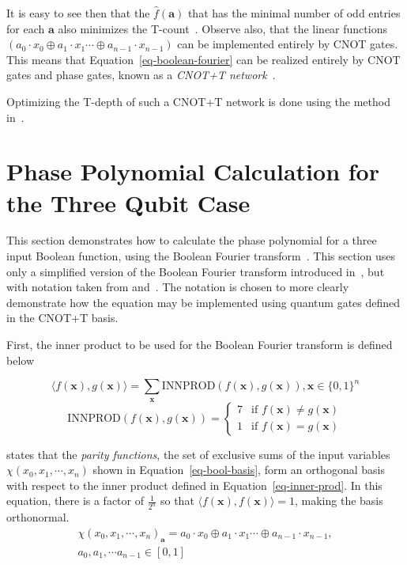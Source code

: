 It is easy to see then that the $\hat{f}(\mathbf{a})$ that has the minimal number of odd entries for each
$\mathbf{a}$ also minimizes the T-count~\cite{bib-amy-rm}. Observe also, that the linear functions
$( a_0 \cdot x_0 \oplus a_1 \cdot x_1 \cdots \oplus a_{n-1} \cdot x_{n-1}) $ can be implemented
entirely by CNOT gates. This means that Equation~\ref{eq-boolean-fourier} can be realized entirely by
CNOT gates and phase gates, known as a {\it CNOT+T network}~\cite{bib-amy-cnot}. 

Optimizing the T-depth of such a CNOT+T network is done using the method in~\cite{bib-amy-matroid}.

\section{Phase Polynomial Calculation for the Three Qubit Case}
\label{Chap:Bool-pbool3q}

This section demonstrates how to calculate the phase polynomial for a three input Boolean function, using the
Boolean Fourier transform~\cite{bib-odonnell}. This section uses only a simplified version
of the Boolean Fourier transform introduced in~\cite{bib-odonnell}, but with notation taken from
\cite{bib-barenco-elementary} and~\cite{bib-amy-cnot}. The notation is chosen to more clearly demonstrate how
the equation may be implemented using quantum gates defined in the CNOT+T basis. 

First, the inner product to be used for the Boolean Fourier transform is defined below

\begin{equation}
  \label{eq-inner-prod}
  \langle f(\mathbf{x}) , g(\mathbf{x}) \rangle = \sum_{\mathbf{x}} \text{INNPROD}(f(\mathbf{x}),g(\mathbf{x})), \mathbf{x} \in \{0,1\}^n
\end{equation}
\begin{equation}  
  \text{INNPROD}(f(\mathbf{x}),g(\mathbf{x})) =
  \begin{cases}
    7 & \text{if $f(\mathbf{x})\neq g(\mathbf{x})$} \\
    1 & \text{if  $f(\mathbf{x})= g(\mathbf{x})$} 
  \end{cases}
\end{equation}

\cite{bib-odonnell} states that the {\it parity functions}, the set of exclusive sums of the input variables
$\chi(x_0,x_1,\cdots,x_n)$ shown in Equation~\ref{eq-bool-basis}, form an orthogonal basis with respect to the
inner product defined in Equation~\ref{eq-inner-prod}. In this equation, there is a factor of $\frac{1}{2^n}$ so
that $\langle f(\mathbf{x}), f(\mathbf{x}) \rangle = 1$, making the basis orthonormal.
\begin{equation}
  \label{eq-bool-basis}
  \begin{split}
  \chi(x_0,x_1,\cdots,x_n)_{\mathbf{a}} = a_0 \cdot x_0 \oplus a_1 \cdot x_1 \cdots \oplus a_{n-1} \cdot x_{n-1},\\
  a_0,a_1,\cdots a_{n-1} \in [0,1]
  \end{split}
\end{equation}

